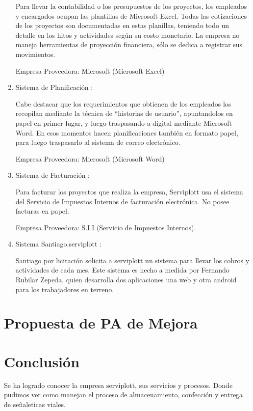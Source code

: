 \begin{enumerate}[1)]
Para llevar la contabilidad o los presupuestos de los proyectos, los empleados y encargados ocupan las plantillas de Microsoft Excel. Todas las cotizaciones de los proyectos son documentadas en estas planillas, teniendo todo un detalle en los hitos y actividades según su costo monetario. La empresa no maneja herramientas de proyección financiera, sólo se dedica a registrar sus movimientos.


Empresa Proveedora: Microsoft (Microsoft Excel)

	\item Sistema de Planificación :


Cabe destacar que los requerimientos que obtienen de los empleados los recopilan mediante la técnica de “historias de usuario”, apuntandolos en papel en primer lugar, y luego traspasando a digital mediante Microsoft Word. En esos momentos hacen planificaciones también en formato papel, para luego traspasarlo al sistema de correo electrónico.


Empresa Proveedora: Microsoft (Microsoft Word)

	\item Sistema de Facturación :


Para facturar los proyectos que realiza la empresa, Serviplott usa el sistema del Servicio de Impuestos Internos de facturación electrónica. No posee facturas en papel.


Empresa Proveedora: S.I.I (Servicio de Impuestos Internos).

	\item Sistema Santiago.serviplott :

Santiago por licitación solicita a serviplott un sistema para llevar los cobros y actividades de cada mes. Este sistema es hecho a medida por Fernando Rubilar Zepeda, quien desarrolla dos aplicaciones una web y otra android para los trabajadores en terreno.


	
	\end{enumerate}
		
\section{Propuesta de PA de Mejora}
\section{Conclusión}

Se ha logrado conocer la empresa serviplott, sus servicios y procesos. Donde pudimos ver como manejan el proceso de almacenamiento, confección y entrega de señaleticas viales. 


